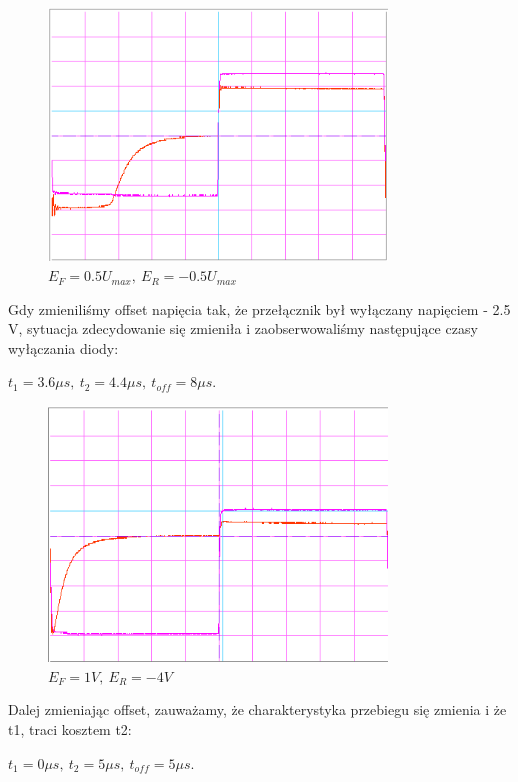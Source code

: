 \documentclass[a4paper,11pt]{article}
\begin{document}
\begin{figure} [H]
  \begin{center}
    \includegraphics[width = 9cm]{../Obrazki_i_tekst/obrobione/1bsciety.png}
    \caption{\( E_F = 0.5 U_{max}, \ E_R = -0.5 U_{max}\)}
  \end{center}
\end{figure}

Gdy zmieniliśmy offset napięcia tak, że przełącznik był wyłączany napięciem - 2.5 V, sytuacja zdecydowanie się zmieniła i zaobserwowaliśmy następujące czasy wyłączania diody:

 \(t_1 = 3.6 \mu s,\ t_2 = 4.4 \mu s,\ t_{off} = 8 \mu s \).

\begin{figure} [H]
  \begin{center}
    \includegraphics[width = 9cm]{../Obrazki_i_tekst/obrobione/1csciety.png}
    \caption{\( E_F = 1V, \ E_R = -4 V\)}
  \end{center}
\end{figure}

Dalej zmieniając offset, zauważamy, że charakterystyka przebiegu się zmienia i że t1, traci kosztem t2:

 \(t_1 = 0 \mu s,\ t_2 = 5 \mu s,\ t_{off} = 5 \mu s \).
\end{document}
